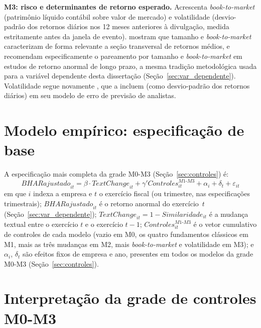 \documentclass[a4paper,12pt]{report}
\begin{document}
\textbf{M3: risco e determinantes de retorno esperado.} Acrescenta \textit{book-to-market} (patrimônio líquido contábil sobre valor de mercado) e volatilidade (desvio-padrão dos retornos diários nos 12 meses anteriores à divulgação, medida estritamente antes da janela de evento).  mostram que tamanho e \textit{book-to-market} caracterizam de forma relevante a seção transversal de retornos médios, e  recomendam especificamente o pareamento por tamanho e \textit{book-to-market} em estudos de retorno anormal de longo prazo, a mesma tradição metodológica usada para a variável dependente desta dissertação (Seção~\ref{sec:var_dependente}). Volatilidade segue novamente , que a incluem (como desvio-padrão dos retornos diários) em seu modelo de erro de previsão de analistas.

\section{Modelo empírico: especificação de base}
\label{sec:modelo}

A especificação mais completa da grade M0-M3 (Seção~\ref{sec:controles}) é:
\begin{equation}
    \mathit{BHARajustado}_{it} = \beta \cdot \mathit{TextChange}_{it} + \gamma' \mathit{Controles}^{M1\text{-}M3}_{it} + \alpha_i + \delta_t + \varepsilon_{it}
    \label{eq:base}
\end{equation}
em que $i$ indexa a empresa e $t$ o exercício fiscal (ou trimestre, nas especificações trimestrais); $\mathit{BHARajustado}_{it}$ é o retorno anormal do exercício~$t$ (Seção~\ref{sec:var_dependente}); $\mathit{TextChange}_{it} = 1 - \mathit{Similaridade}_{it}$ é a mudança textual entre o exercício $t$ e o exercício $t-1$; $\mathit{Controles}^{M1\text{-}M3}_{it}$ é o vetor cumulativo de controles de cada modelo (vazio em M0, os quatro fundamentos clássicos em M1, mais as três mudanças em M2, mais \textit{book-to-market} e volatilidade em M3); e $\alpha_i$, $\delta_t$ são efeitos fixos de empresa e ano, presentes em todos os modelos da grade M0-M3 (Seção~\ref{sec:controles}).

\section{Interpretação da grade de controles M0-M3}
\label{sec:leitura_beta}
\end{document}
